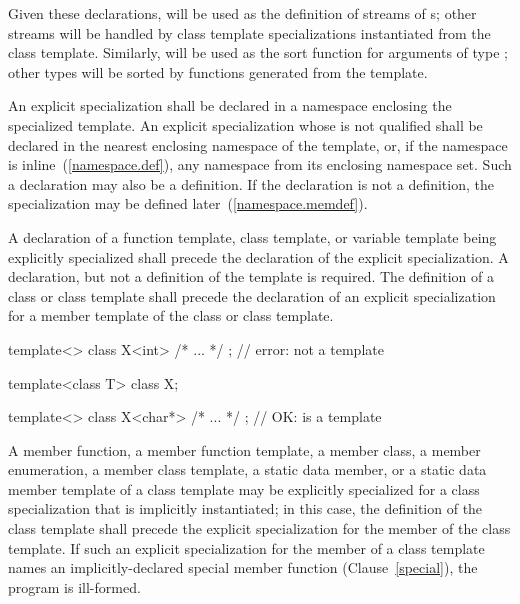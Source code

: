 Given these declarations,
will be used as the definition of streams of
s;
other streams will be handled by class template specializations instantiated
from the class template.
Similarly,
will be used as the sort function for arguments
of type
;
other
types will be sorted by functions generated from the template.
\exitexample

\pnum
An explicit specialization shall be declared in a namespace enclosing the specialized template.
An explicit specialization
whose  is not qualified
shall be declared in the nearest enclosing namespace of the template,
or, if the namespace is inline~(\ref{namespace.def}), any namespace from its enclosing namespace set.
Such a declaration may also be a definition.
If the declaration is not a definition, the specialization may be
defined later~(\ref{namespace.memdef}).

\pnum
A declaration of a function template, class template, or variable template being explicitly
specialized shall precede the declaration of
the explicit
specialization.
\enternote
A declaration, but not a definition of the template is required.
\exitnote
The definition of a class or class template shall precede the
declaration of an explicit specialization for a member template of the class
or class template.
\enterexample

\begin{codeblock}
template<> class X<int> { /* ... */ };          // error:  not a template

template<class T> class X;

template<> class X<char*> { /* ... */ };        // OK:  is a template
\end{codeblock}
\exitexample

\pnum
A member function, a member function template, a member class,
a member enumeration, a
member class template,
a static data member, or a static data member template of a class template
may be explicitly specialized for a class specialization that is implicitly
instantiated;
in this case, the definition of the class template shall
precede the explicit specialization for the member of the class
template.
If such an explicit specialization for the member of a class template names an
implicitly-declared special member function (Clause~\ref{special}),
the program is ill-formed.


